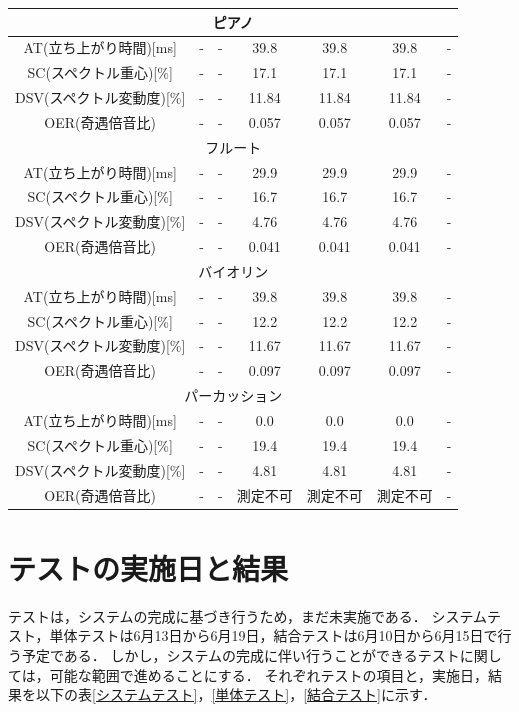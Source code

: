 \documentclass[uplatex,dvipdfmx]{jsarticle}
\begin{document}
\begin{table}[H]
{\begin{tabular}{|c|c|c|c|c|c|c|}
    \multicolumn{7}{|c|}{ピアノ} \\ \hline
      AT(立ち上がり時間)[ms]               & - & - & 39.8 & 39.8 & 39.8  & - \\ \hline
      SC(スペクトル重心)[\%]               & - & - & 17.1 & 17.1 & 17.1 & - \\ \hline
      DSV(スペクトル変動度)[\%]            & - & - & 11.84 & 11.84 &11.84  & - \\ \hline
      OER(奇遇倍音比)                     & - & - & 0.057 & 0.057 &0.057 & - \\ \hline
      \multicolumn{7}{|c|}{フルート} \\ \hline
      AT(立ち上がり時間)[ms]               & - & - & 29.9 & 29.9 & 29.9 & - \\ \hline
      SC(スペクトル重心)[\%]               & - & - & 16.7 & 16.7 & 16.7  & - \\ \hline
      DSV(スペクトル変動度)[\%]            & - & - & 4.76 & 4.76 & 4.76 & - \\ \hline
      OER(奇遇倍音比)                     & - & - & 0.041 & 0.041 & 0.041 & - \\ \hline
    \multicolumn{7}{|c|}{バイオリン} \\ \hline
      AT(立ち上がり時間)[ms]               & - & - & 39.8 & 39.8 & 39.8 & - \\ \hline
      SC(スペクトル重心)[\%]               & - & - & 12.2 & 12.2 & 12.2 & - \\ \hline
      DSV(スペクトル変動度)[\%]            & - & - & 11.67 & 11.67 & 11.67  & - \\ \hline
      OER(奇遇倍音比)                     & - & - & 0.097 & 0.097 & 0.097 & - \\ \hline
      \multicolumn{7}{|c|}{パーカッション} \\ \hline
      AT(立ち上がり時間)[ms]               & - & - & 0.0 & 0.0 & 0.0& - \\ \hline
      SC(スペクトル重心)[\%]               & - & - & 19.4 & 19.4 & 19.4 & - \\ \hline
      DSV(スペクトル変動度)[\%]            & - & - & 4.81 & 4.81 & 4.81 & - \\ \hline
      OER(奇遇倍音比)                     & - & - & 測定不可 & 測定不可 & 測定不可 & - \\ \hline
    \end{tabular}              
  }
\end{table}



\section{テストの実施日と結果}
テストは，システムの完成に基づき行うため，まだ未実施である．
システムテスト，単体テストは6月13日から6月19日，結合テストは6月10日から6月15日で行う予定である．
しかし，システムの完成に伴い行うことができるテストに関しては，可能な範囲で進めることにする．
それぞれテストの項目と，実施日，結果を以下の表\ref{システムテスト}，\ref{単体テスト}，\ref{結合テスト}に示す．
\end{document}
